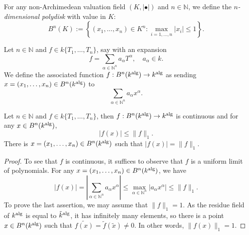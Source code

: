 \begin{definition}
    For any non-Archimedean valuation field $(K,|\bullet|)$ and $n\in \mathbb{N}$, we define the \emph{$n$-dimensional polydisk} with value in $K$:
    \[
        B^n(K):=\left\{(x_1,\ldots,x_n)\in K^n: \max_{i=1,\ldots,n}|x_i|\leq 1\right\}.
    \]
\end{definition}

\begin{definition}
    Let $n\in \mathbb{N}$ and $f\in k\{T_1,\ldots,T_n\}$, say with an expansion
    \[
        f=\sum_{\alpha \in \mathbb{N}^n} a_{\alpha}T^{\alpha},\quad a_{\alpha}\in k.  
    \]
    We define the associated function $f:B^n(k^{\mathrm{alg}})\rightarrow k^{\mathrm{alg}}$ as sending $x=(x_1,\ldots,x_n)\in B^n(k^{\mathrm{alg}})$ to 
    \[
        \sum_{\alpha \in \mathbb{N}^n} a_{\alpha}x^{\alpha}.
    \]
\end{definition}


\begin{lemma}\label{lma-finducecontfunction}
    Let $n\in \mathbb{N}$ and $f\in k\{T_1,\ldots,T_n\}$, then $f:B^n(k^{\mathrm{alg}})\rightarrow k^{\mathrm{alg}}$ is continuous and for any $x\in B^n(k^{\mathrm{alg}})$,
    \[
        |f(x)|\leq \|f\|_1.
    \]
    There is $x=(x_1,\ldots,x_n)\in B^n(k^{\mathrm{alg}})$ such that $|f(x)|=\|f\|_1$.
\end{lemma}
\begin{proof}
    To see that $f$ is continuous, it suffices to observe that $f$ is a uniform limit of polynomials. For any $x=(x_1,\ldots,x_n)\in B^n(k^{\mathrm{alg}})$, we have
    \[
        |f(x)|  =\left|\sum_{\alpha \in \mathbb{N}^n} a_{\alpha}x^{\alpha}\right|\leq \max_{\alpha \in \mathbb{N}^n} |a_{\alpha}x^{\alpha}|\leq \|f\|_1.
    \]
    To prove the last assertion, we may assume that $\|f\|_1=1$. As the residue field of $k^{\mathrm{alg}}$ is equal to $\tilde{k}^{\mathrm{alg}}$, it has infinitely many elements, so there is a point $x\in B^n(k^{\mathrm{alg}})$ such that $\widetilde{f(x)}=\tilde{f}(\tilde{x})\neq 0$. In other words, $\|f(x)\|_1=1$.
\end{proof}

